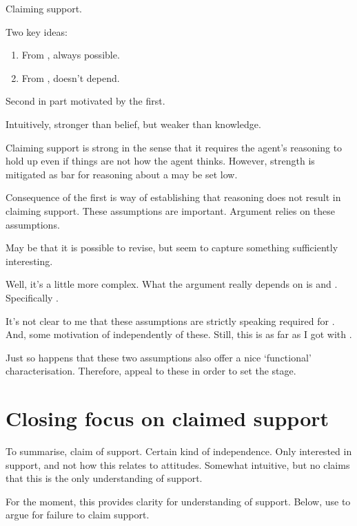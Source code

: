 \begin{note}
  Claiming support.

  Two key ideas:

  \begin{enumerate}
  \item From \nfcs{}, always possible.
  \item From \eiS{}, doesn't depend.
  \end{enumerate}
  Second in part motivated by the first.

  Intuitively, stronger than belief, but weaker than knowledge.

  {
    \color{red}
    Claiming support is strong in the sense that it requires the agent's reasoning to hold up even if things are not how the agent thinks.
    However, strength is mitigated as bar for reasoning about a \requ{} may be set low.
  }

  Consequence of the first is way of establishing that reasoning does not result in claiming support.
  These assumptions are important.
  Argument relies on these assumptions.

  May be that it is possible to revise, but seem to capture something sufficiently interesting.
\end{note}

\begin{note}
  Well, it's a little more complex.
  What the argument really depends on is \ESU{} and \nI{}.
  Specifically \nI{}.

  It's not clear to me that these assumptions are strictly speaking required for \nI{}.
  And, some motivation of \nI{} independently of these.
  Still, this is as far as I got with \nI{}.

  Just so happens that these two assumptions also offer a nice `functional' characterisation.
  Therefore, appeal to these in order to set the stage.
\end{note}

\section{Closing focus on claimed support}

\begin{note}
  To summarise, claim of support.
  Certain kind of independence.
  Only interested in support, and not how this relates to attitudes.
  Somewhat intuitive, but no claims that this is the only understanding of support.

  For the moment, this provides clarity for understanding of support.
  Below, use to argue for failure to claim support.
\end{note}

